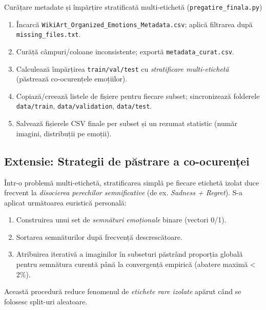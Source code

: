 \begin{algorithm}[H]
\caption{Curățare metadate și împărțire stratificată multi-etichetă (\texttt{pregatire\_finala.py})}
\label{alg:c5-clean-metadata-split}
\begin{enumerate}
  \item Încarcă \texttt{WikiArt\_Organized\_Emotions\_Metadata.csv}; aplică filtrarea după \texttt{missing\_files.txt}.
  \item Curăță câmpuri/coloane inconsistente; exportă \texttt{metadata\_curat.csv}.
  \item Calculează împărțirea \texttt{train/val/test} cu \emph{stratificare multi-etichetă} (păstrează co-ocurențele emoțiilor).
  \item Copiază/creează listele de fișiere pentru fiecare subset; sincronizează folderele \texttt{data/train}, \texttt{data/validation}, \texttt{data/test}.
  \item Salvează fișierele CSV finale per subset și un rezumat statistic (număr imagini, distribuții pe emoții).
\end{enumerate}
\end{algorithm}

\subsection*{Extensie: Strategii de păstrare a co-ocurenței}
\noindent Într-o problemă multi-etichetă, stratificarea simplă pe fiecare etichetă izolat duce frecvent la \emph{disocierea perechilor semnificative} (de ex. \emph{Sadness + Regret}). S-a aplicat următoarea euristică personală:
\begin{enumerate}
  \item Construirea unui set de \emph{semnături emoționale} binare (vectori 0/1).
  \item Sortarea semnăturilor după frecvență descrescătoare.
  \item Atribuirea iterativă a imaginilor în subseturi păstrând proporția globală pentru semnătura curentă până la convergență empirică (abatere maximă < 2\%).
\end{enumerate}
Această procedură reduce fenomenul de \emph{etichete rare izolate} apărut când se folosesc split-uri aleatoare.

